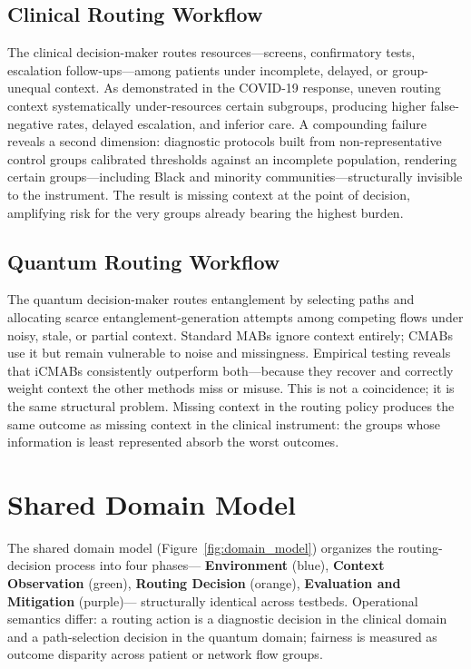 \documentclass{IEEEtran}
\begin{document}
\subsection{Clinical Routing Workflow}
The clinical decision-maker routes resources---screens, confirmatory tests,
escalation follow-ups---among patients under incomplete, delayed, or
group-unequal context. As demonstrated in the COVID-19 response, uneven
routing context systematically under-resources certain subgroups, producing
higher false-negative rates, delayed escalation, and inferior care. A
compounding failure reveals a second dimension: diagnostic protocols built
from non-representative control groups calibrated thresholds against an
incomplete population, rendering certain groups---including Black and minority
communities---structurally invisible to the instrument. The result is missing
context at the point of decision, amplifying risk for the very groups already
bearing the highest burden.

\subsection{Quantum Routing Workflow}
The quantum decision-maker routes entanglement by selecting paths and
allocating scarce entanglement-generation attempts among competing flows
under noisy, stale, or partial context. Standard MABs ignore context
entirely; CMABs use it but remain vulnerable to noise and missingness.
Empirical testing reveals that iCMABs consistently outperform both---because
they recover and correctly weight context the other methods miss or misuse.
This is not a coincidence; it is the same structural problem. Missing context
in the routing policy produces the same outcome as missing context in the
clinical instrument: the groups whose information is least represented absorb
the worst outcomes.

\section{Shared Domain Model}

The shared domain model (Figure~\ref{fig:domain_model}) organizes the
routing-decision process into four phases---
\textcolor{phase1blue}{\textbf{Environment}} (blue),
\textcolor{phase2green}{\textbf{Context Observation}} (green),
\textcolor{phase3orange}{\textbf{Routing Decision}} (orange),
\textcolor{phase4purple}{\textbf{Evaluation and Mitigation}} (purple)---
structurally identical across testbeds. Operational semantics differ:
a routing action is a diagnostic decision in the clinical domain and a
path-selection decision in the quantum domain; fairness is measured as
outcome disparity across patient or network flow groups.
\end{document}
